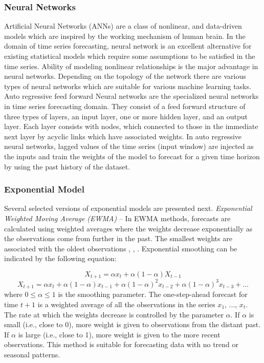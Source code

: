 \subsubsection{Neural Networks}
Artificial Neural Networks (ANNs) are a class of nonlinear, and data-driven models which are inspired by the working mechanism of human brain. In the domain of time series forecasting, neural network is an excellent alternative for existing statistical models which require some assumptions to be satisfied in the time series. Ability of modeling nonlinear relationships is the major advantage in neural networks. Depending on the topology of the network there are various types of neural networks which are suitable for various machine learning tasks. Auto regressive feed forward Neural networks are the specialized neural networks in time series forecasting domain. They consist of a feed forward structure of three types of layers, an input layer, one or more hidden layer, and an output layer. Each layer consists with nodes, which connected to those in the immediate next layer by acyclic links which have associated weights. In auto regressive neural networks, lagged values of the time series (input window) are injected as the inputs and train the weights of the model to forecast for a given time horizon by using the past history of the dataset. 


\subsubsection{Exponential Model}
Several selected versions of exponential models are presented next.
\noindent
\textit{Exponential Weighted Moving Average (EWMA)} --
In EWMA methods, forecasts are calculated using weighted averages where the weights decrease exponentially as the observations come from further in the past. The smallest weights are associated with the oldest observations \cite{Forecasting_OTexts}, \cite{STAT510}, \cite{StatSoft}. Exponential smoothing can be indicated by the following equation:

\noindent
	$$X_{t+1}=\alpha x_t +\alpha(1-\alpha)X_{t-1}$$
	$$X_{t+1}=\alpha x_t +\alpha(1-\alpha)x_{t-1}+\alpha(1-\alpha)^2x_{t-2}+\alpha(1-\alpha)^3x_{t-3}+...$$
where $0\leq \alpha \leq 1$ is the smoothing parameter. The one-step-ahead forecast for time $t+1$ is a weighted average of all the observations in the series $x_1$, ..., $x_t$. The rate at which the weights decrease is controlled by the parameter $\alpha$. If $\alpha$ is small (i.e., close to 0), more weight is given to observations from the distant past. If $\alpha$ is large (i.e., close to 1), more weight is given to the more recent observations. This method is suitable for forecasting data with no trend or seasonal patterns.

